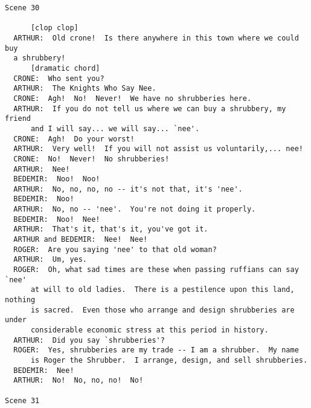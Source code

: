 \documentclass{article}
\begin{document}
\begin{verbatim}
Scene 30

      [clop clop]
  ARTHUR:  Old crone!  Is there anywhere in this town where we could buy
  a shrubbery!
      [dramatic chord]
  CRONE:  Who sent you?
  ARTHUR:  The Knights Who Say Nee.
  CRONE:  Agh!  No!  Never!  We have no shrubberies here.
  ARTHUR:  If you do not tell us where we can buy a shrubbery, my friend
      and I will say... we will say... `nee'.
  CRONE:  Agh!  Do your worst!
  ARTHUR:  Very well!  If you will not assist us voluntarily,... nee!
  CRONE:  No!  Never!  No shrubberies!
  ARTHUR:  Nee!
  BEDEMIR:  Noo!  Noo!
  ARTHUR:  No, no, no, no -- it's not that, it's 'nee'.
  BEDEMIR:  Noo!
  ARTHUR:  No, no -- 'nee'.  You're not doing it properly.
  BEDEMIR:  Noo!  Nee!
  ARTHUR:  That's it, that's it, you've got it.
  ARTHUR and BEDEMIR:  Nee!  Nee!
  ROGER:  Are you saying 'nee' to that old woman?
  ARTHUR:  Um, yes.
  ROGER:  Oh, what sad times are these when passing ruffians can say `nee'
      at will to old ladies.  There is a pestilence upon this land, nothing
      is sacred.  Even those who arrange and design shrubberies are under
      considerable economic stress at this period in history.
  ARTHUR:  Did you say `shrubberies'?
  ROGER:  Yes, shrubberies are my trade -- I am a shrubber.  My name
      is Roger the Shrubber.  I arrange, design, and sell shrubberies.
  BEDEMIR:  Nee!
  ARTHUR:  No!  No, no, no!  No!

Scene 31


\end{verbatim}
\end{document}
